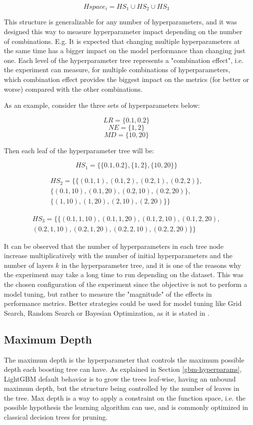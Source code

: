 $$Hspace_i = HS_1 \cup HS_2 \cup HS_3$$

This structure is generalizable for any number of hyperparameters, and it was designed this way to measure hyperparameter impact depending on the number of combinations. E.g. It is expected that changing multiple hyperparameters at the same time has a bigger impact on the model performance than changing just one. Each level of the hyperparameter tree represents a "combination effect", i.e. the experiment can measure, for multiple combinations of hyperparameters, which combination effect provides the biggest impact on the metrics (for better or worse) compared with the other combinations.

As an example, consider the three sets of hyperparameters below:

$$LR = \{0.1, 0.2\}$$
$$NE = \{1, 2\}$$
$$MD = \{10, 20\}$$

Then each leaf of the hyperparameter tree will be:

$$HS_1 = \Big\{\{0.1, 0.2\}, \{1, 2\}, \{10, 20\}\Big\}$$

\begin{align*}
    HS_2 = \Big\{\{(0.1, 1), (0.1, 2), (0.2, 1), (0.2, 2)\}, \\
            \{(0.1, 10), (0.1, 20), (0.2, 10), (0.2, 20)\}, \\
            \{(1, 10), (1, 20), (2, 10), (2, 20)\}\Big\}
\end{align*}

\begin{align*}
    HS_3 = \Big\{\{(0.1, 1, 10), (0.1, 1, 20), (0.1, 2, 10), (0.1, 2, 20), \\
    (0.2, 1, 10), (0.2, 1, 20), (0.2, 2, 10), (0.2, 2, 20)\}\Big\}
\end{align*}

It can be observed that the number of hyperparameters in each tree node increase multiplicatively with the number of initial hyperparameters and the number of layers $k$ in the hyperparameter tree, and it is one of the reasons why the experiment may take a long time to run depending on the dataset. This was the chosen configuration of the experiment since the objective is not to perform a model tuning, but rather to measure the "magnitude" of the effects in performance metrics. Better strategies could be used for model tuning like Grid Search, Random Search or Bayesian Optimization, as it is stated in \cite{probst2018tunability}.

\subsection{Maximum Depth}
\label{subsec:max-depth}
The maximum depth is the hyperparameter that controls the maximum possible depth each boosting tree can have. As explained in Section \ref{gbm-hyperparams}, LightGBM default behavior is to grow the trees leaf-wise, having an unbound maximum depth, but the structure being controlled by the number of leaves in the tree. Max depth is a way to apply a constraint on the function space, i.e. the possible hypothesis the learning algorithm can use, and is commonly optimized in classical decision trees for pruning. 


